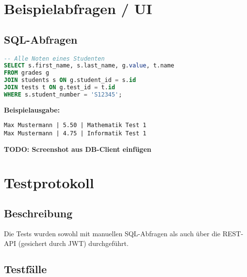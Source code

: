 \documentclass[12pt,a4paper]{article}
\begin{document}
    \section{Beispielabfragen / UI}

    \subsection{SQL-Abfragen}
    \begin{lstlisting}[language=SQL]
-- Alle Noten eines Studenten
SELECT s.first_name, s.last_name, g.value, t.name
FROM grades g
JOIN students s ON g.student_id = s.id
JOIN tests t ON g.test_id = t.id
WHERE s.student_number = 'S12345';
    \end{lstlisting}

    \textbf{Beispielausgabe:}
    \begin{verbatim}
Max Mustermann | 5.50 | Mathematik Test 1
Max Mustermann | 4.75 | Informatik Test 1
    \end{verbatim}

    \textbf{TODO: Screenshot aus DB-Client einfügen}
    \newpage



    \section{Testprotokoll}

    \subsection{Beschreibung}
    Die Tests wurden sowohl mit manuellen SQL-Abfragen als auch über die REST-API (gesichert durch JWT) durchgeführt.

    \subsection{Testfälle}\label{sec:testfaelle}
\end{document}
